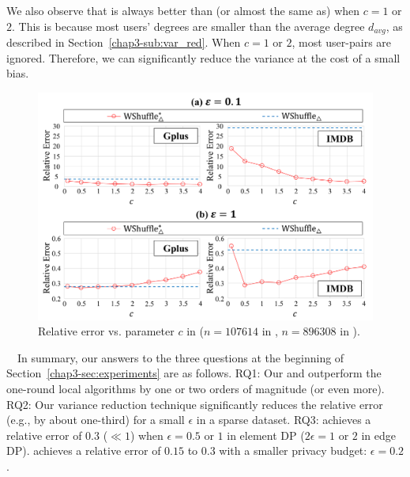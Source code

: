 We also observe that \AlgWSTriVR{} is always better than (or almost the same as) \AlgWSTri{} when $c=1$ or $2$. 
This is because most users' degrees are smaller than the average degree $d_{avg}$, as described in Section~\ref{chap3-sub:var_red}. 
When $c=1$ or $2$, most user-pairs are ignored. 
Therefore, we can significantly reduce the variance at the cost of a small bias. 

\begin{figure}[t]
  \centering
  \includegraphics[width=0.99\linewidth]{fig/res4_thr.pdf}
  
  \caption{Relative error vs. parameter $c$ in \AlgWSTriVR{} ($n=107614$ in \Gplus{}, $n=896308$ in \IMDB{}).
  }
  \label{chap3-fig:res4_thr}
\end{figure}

\smallskip
{}~~In summary, our answers to the three questions at the beginning of Section~\ref{chap3-sec:experiments} are as follows. 
RQ1: Our \AlgWSTriVR{} and \AlgWSCyc{} outperform the one-round local algorithms by one or two orders of magnitude (or even more). 
RQ2: Our variance reduction technique significantly reduces the relative error (e.g., by about one-third) 
for a small $\epsilon$ in a sparse dataset. 
RQ3: 
\AlgWSTriVR{} achieves a relative error of $0.3$ ($\ll 1$) when $\epsilon=0.5$ or $1$ in element DP ($2\epsilon=1$ or $2$ in edge DP). 
\AlgWSCyc{} achieves a relative error of $0.15$ to $0.3$ with a smaller privacy budget: $\epsilon=0.2$. 